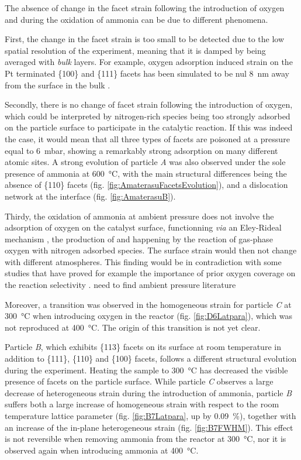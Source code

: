The absence of change in the facet strain following the introduction of oxygen and during the oxidation of ammonia can be due to different phenomena.

First, the change in the facet strain is too small to be detected due to the low spatial resolution of the experiment, meaning that it is damped by being averaged with \textit{bulk} layers.
For example, oxygen adsorption induced strain on the Pt terminated \{100\} and \{111\} facets has been simulated to be nul \qty{8}{\nm} away from the surface in the bulk \parencite{Kim2021}.

Secondly, there is no change of facet strain following the introduction of oxygen, which could be interpreted by nitrogen-rich species being too strongly adsorbed on the particle surface to participate in the catalytic reaction.
If this was indeed the case, it would mean that all three types of facets are poisoned at a  pressure equal to \qty{6}{\milli\bar}, showing a remarkably strong adsorption on many different atomic sites.
A strong evolution of particle \textit{A} was also observed under the sole presence of ammonia at \qty{600}{\degreeCelsius}, with the main structural differences being the absence of \{110\} facets (fig. \ref{fig:AmaterasuFacetsEvolution}), and a dislocation network at the interface (fig. \ref{fig:AmaterasuB}).

Thirdy, the oxidation of ammonia at ambient pressure does not involve the adsorption of oxygen on the catalyst surface, functionning \textit{via} an Eley-Rideal mechanism \parencite{Rideal1939}, the production of  and  happening by the reaction of gas-phase oxygen with nitrogen adsorbed species.
The surface strain would then not change with different atmospheres.
This finding would be in contradiction with some studies that have proved for example the importance of prior oxygen coverage on the reaction selectivity \parencite{Bradley1995}.
\textcolor{Important}{need to find ambient pressure literature}

Moreover, a transition was observed in the homogeneous strain for particle \textit{C} at \qty{300}{\degreeCelsius} when introducing oxygen in the reactor (fig. \ref{fig:D6Latpara}), which was not reproduced at \qty{400}{\degreeCelsius}.
The origin of this transition is not yet clear.

Particle \textit{B}, which exhibits \{113\} facets on its surface at room temperature in addition to \{111\}, \{110\} and \{100\} facets, follows a different structural evolution during the experiment.
Heating the sample to \qty{300}{\degreeCelsius} has decreased the visible presence of facets on the particle surface.
While particle \textit{C} observes a large decrease of heterogeneous strain during the introduction of ammonia, particle \textit{B} suffers both a large increase of homogeneous strain with respect to the room temperature lattice parameter (fig. \ref{fig:B7Latpara}, up by \qty{0.09}{\percent}), together with an increase of the in-plane heterogeneous strain (fig. \ref{fig:B7FWHM}).
This effect is not reversible when removing ammonia from the reactor at \qty{300}{\degreeCelsius}, nor it is observed again when introducing ammonia at \qty{400}{\degreeCelsius}.

